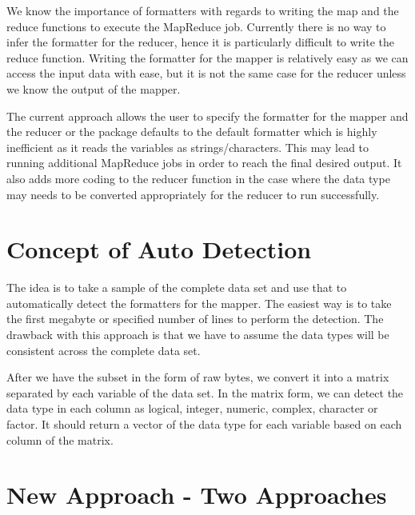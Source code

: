 \documentclass[11pt]{book}
\begin{document}
We know the importance of formatters with regards to writing the map and the reduce functions to execute the MapReduce job. Currently there is no way to infer the formatter for the reducer, hence it is particularly difficult to write the reduce function. Writing the formatter for the mapper is relatively easy as we can access the input data with ease, but it is not the same case for the reducer unless we know the output of the mapper.

The current approach allows the user to specify the formatter for the mapper and the reducer or the package defaults to the default formatter which is highly inefficient as it reads the variables as strings/characters. This may lead to running additional MapReduce jobs in order to reach the final desired output. It also adds more coding to the reducer function in the case where the data type may needs to be converted appropriately for the reducer to run successfully.



\section{Concept of Auto Detection}

The idea is to take a sample of the complete data set and use that to automatically detect the formatters for the mapper. The easiest way is to take the first megabyte or specified number of lines to perform the detection. The drawback with this approach is that we have to assume the data types will be consistent across the complete data set. 

After we have the subset in the form of raw bytes, we convert it into a matrix separated by each variable of the data set. In the matrix form, we can detect the data type in each column as logical, integer, numeric, complex, character or factor. It should return a vector of the data type for each variable based on each column of the matrix. 

\section{New Approach - Two Approaches}

\end{document}
